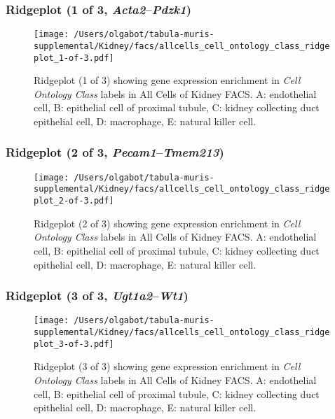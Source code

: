 \clearpage

\subsubsection{Ridgeplot (1 of 3, \emph{Acta2}--\emph{Pdzk1})}
\begin{figure}[h]
\centering
\texttt{[image: /Users/olgabot/tabula-muris-supplemental/Kidney/facs/allcells\_cell\_ontology\_class\_ridgeplot\_1-of-3.pdf]}

\caption{ Ridgeplot (1 of 3)  showing gene expression enrichment in \emph{Cell Ontology Class} labels in All Cells of Kidney FACS. A: endothelial cell, B: epithelial cell of proximal tubule, C: kidney collecting duct epithelial cell, D: macrophage, E: natural killer cell.}
\end{figure}


\clearpage

\subsubsection{Ridgeplot (2 of 3, \emph{Pecam1}--\emph{Tmem213})}
\begin{figure}[h]
\centering
\texttt{[image: /Users/olgabot/tabula-muris-supplemental/Kidney/facs/allcells\_cell\_ontology\_class\_ridgeplot\_2-of-3.pdf]}

\caption{ Ridgeplot (2 of 3)  showing gene expression enrichment in \emph{Cell Ontology Class} labels in All Cells of Kidney FACS. A: endothelial cell, B: epithelial cell of proximal tubule, C: kidney collecting duct epithelial cell, D: macrophage, E: natural killer cell.}
\end{figure}


\clearpage

\subsubsection{Ridgeplot (3 of 3, \emph{Ugt1a2}--\emph{Wt1})}
\begin{figure}[h]
\centering
\texttt{[image: /Users/olgabot/tabula-muris-supplemental/Kidney/facs/allcells\_cell\_ontology\_class\_ridgeplot\_3-of-3.pdf]}

\caption{ Ridgeplot (3 of 3)  showing gene expression enrichment in \emph{Cell Ontology Class} labels in All Cells of Kidney FACS. A: endothelial cell, B: epithelial cell of proximal tubule, C: kidney collecting duct epithelial cell, D: macrophage, E: natural killer cell.}
\end{figure}


